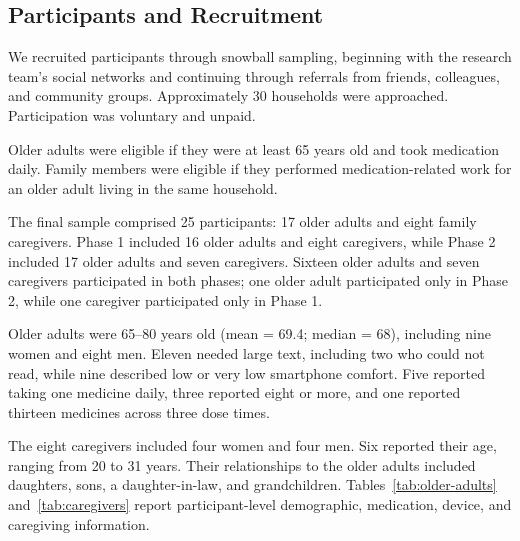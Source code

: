\subsection{Participants and Recruitment}

We recruited participants through snowball sampling, beginning with the research team's social networks and continuing through referrals from friends, colleagues, and community groups. Approximately 30 households were approached. Participation was voluntary and unpaid.

Older adults were eligible if they were at least 65 years old and took medication daily. Family members were eligible if they performed medication-related work for an older adult living in the same household.

The final sample comprised 25 participants: 17 older adults and eight family caregivers. Phase 1 included 16 older adults and eight caregivers, while Phase 2 included 17 older adults and seven caregivers. Sixteen older adults and seven caregivers participated in both phases; one older adult participated only in Phase 2, while one caregiver participated only in Phase 1.

Older adults were 65--80 years old (mean = 69.4; median = 68), including nine women and eight men. Eleven needed large text, including two who could not read, while nine described low or very low smartphone comfort. Five reported taking one medicine daily, three reported eight or more, and one reported thirteen medicines across three dose times.

The eight caregivers included four women and four men. Six reported their age, ranging from 20 to 31 years. Their relationships to the older adults included daughters, sons, a daughter-in-law, and grandchildren. Tables~\ref{tab:older-adults} and~\ref{tab:caregivers} report participant-level demographic, medication, device, and caregiving information.

